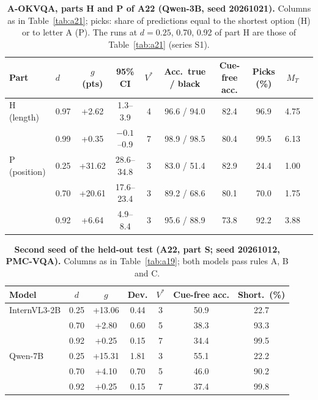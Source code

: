 \begin{table}[t]
  \centering
  \footnotesize
  \setlength{\tabcolsep}{4pt}
  \begin{tabular}{@{}llcccccccc@{}}
    \toprule
    Part & $d$ & $g$ (pts) & 95\% CI & $V^\ast$ & Acc.\ true / black & Cue-free acc. & Picks (\%) & $M_T$ \\
    \midrule
    H (length) & 0.97 & +2.62 & 1.3--3.9 & 4 & 96.6 / 94.0 & 82.4 & 96.9 & 4.75 \\
     & 0.99 & +0.35 & $-0.1$--0.9 & 7 & 98.9 / 98.5 & 80.4 & 99.5 & 6.13 \\
    P (position) & 0.25 & +31.62 & 28.6--34.8 & 3 & 83.0 / 51.4 & 82.9 & 24.4 & 1.00 \\
     & 0.70 & +20.61 & 17.6--23.4 & 3 & 89.2 / 68.6 & 80.1 & 70.0 & 1.75 \\
     & 0.92 & +6.64 & 4.9--8.4 & 3 & 95.6 / 88.9 & 73.8 & 92.2 & 3.88 \\
    \bottomrule
  \end{tabular}
  \caption{\textbf{A-OKVQA, parts H and P of A22 (Qwen-3B, seed 20261021).} Columns as in Table~\ref{tab:a21}; picks: share of predictions equal to the shortest option (H) or to letter A (P). The runs at $d=0.25$, 0.70, 0.92 of part H are those of Table~\ref{tab:a21} (series S1).}
  \label{tab:a22hp}
\end{table}

\begin{table}[tbp]
  \centering
  \footnotesize
  \setlength{\tabcolsep}{2.4pt}
  \begin{tabular}{@{}lcccccc@{}}
    \toprule
    Model & $d$ & $g$ & Dev. & $V^\ast$ & Cue-free acc. & Short.\ (\%) \\
    \midrule
    InternVL3-2B & 0.25 & +13.06 & 0.44 & 3 & 50.9 & 22.7 \\
     & 0.70 & +2.80 & 0.60 & 5 & 38.3 & 93.3 \\
     & 0.92 & +0.25 & 0.15 & 7 & 34.4 & 99.5 \\
    Qwen-7B & 0.25 & +15.31 & 1.81 & 3 & 55.1 & 22.2 \\
     & 0.70 & +4.10 & 0.70 & 5 & 46.0 & 90.2 \\
     & 0.92 & +0.25 & 0.15 & 7 & 37.4 & 99.8 \\
    \bottomrule
  \end{tabular}
  \caption{\textbf{Second seed of the held-out test (A22, part S; seed 20261012, PMC-VQA).} Columns as in Table~\ref{tab:a19}; both models pass rules A, B and C.}
  \label{tab:a22s}
\end{table}

